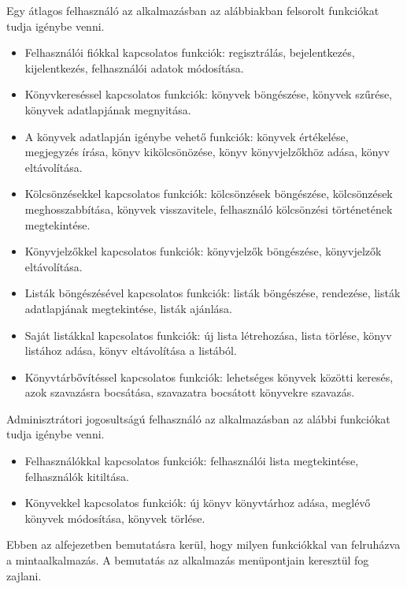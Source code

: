 Egy átlagos felhasználó az alkalmazásban az alábbiakban felsorolt funkciókat tudja igénybe venni.
\begin{itemize}
    \item Felhasználói fiókkal kapcsolatos funkciók: regisztrálás, bejelentkezés, kijelentkezés, felhasználói adatok módosítása.
    \item Könyvkereséssel kapcsolatos funkciók: könyvek böngészése, könyvek szűrése, \\ könyvek adatlapjának megnyitása.
    \item A könyvek adatlapján igénybe vehető funkciók: könyvek értékelése, megjegyzés írása, könyv kikölcsönözése, könyv könyvjelzőkhöz adása, könyv eltávolítása.
    \item Kölcsönzésekkel kapcsolatos funkciók: kölcsönzések böngészése, kölcsönzések \\ meghosszabbítása, könyvek visszavitele, felhasználó kölcsönzési történetének \\ megtekintése.
    \item Könyvjelzőkkel kapcsolatos funkciók: könyvjelzők böngészése, könyvjelzők eltávolítása.
    \item Listák böngészésével kapcsolatos funkciók: listák böngészése, rendezése, listák adatlapjának megtekintése, listák ajánlása.
    \item Saját listákkal kapcsolatos funkciók: új lista létrehozása, lista törlése, könyv listához adása, könyv eltávolítása a listából.
    \item Könyvtárbővítéssel kapcsolatos funkciók: lehetséges könyvek közötti keresés, azok szavazásra bocsátása, szavazatra bocsátott könyvekre szavazás.
\end{itemize}

Adminisztrátori jogosultságú felhasználó az alkalmazásban az alábbi funkciókat tudja igénybe venni.
\begin{itemize}
    \item Felhasználókkal kapcsolatos funkciók: felhasználói lista megtekintése, felhasználók kitiltása.
    \item Könyvekkel kapcsolatos funkciók: új könyv könyvtárhoz adása, meglévő könyvek módosítása, könyvek törlése.
\end{itemize}


Ebben az alfejezetben bemutatásra kerül, hogy milyen funkciókkal van felruházva a mintaalkalmazás. A bemutatás az alkalmazás menüpontjain keresztül fog zajlani.

